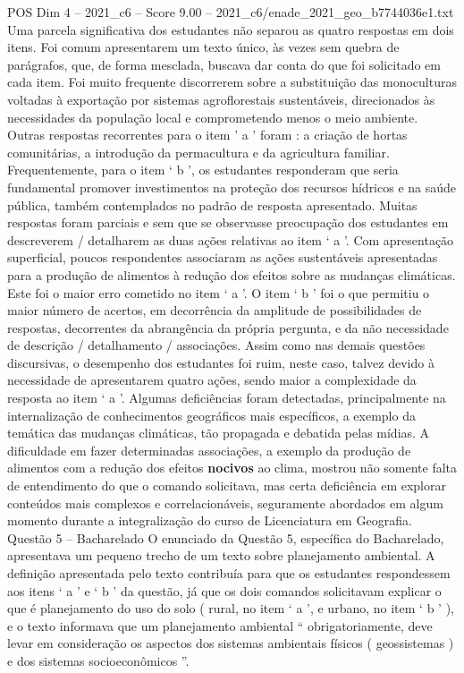 \begin{textsample}{POS Dim 4 – 2021\_c6 – Score 9.00 – 2021\_c6/enade\_2021\_geo\_b7744036e1.txt}
Uma parcela significativa dos estudantes não separou as quatro respostas em dois itens.
Foi comum apresentarem um texto único, às vezes sem quebra de parágrafos, que, de forma mesclada, buscava dar conta do que foi solicitado em cada item.
Foi muito frequente discorrerem sobre a substituição das monoculturas voltadas à exportação por sistemas agroflorestais sustentáveis, direcionados às necessidades da população local e comprometendo menos o meio ambiente.
Outras respostas recorrentes para o item ’ a ’ foram : a criação de hortas comunitárias, a introdução da permacultura e da agricultura familiar.
Frequentemente, para o item ‘ b ’, os estudantes responderam que seria fundamental promover investimentos na proteção dos recursos hídricos e na saúde pública, também contemplados no padrão de resposta apresentado.
Muitas respostas foram parciais e sem que se observasse preocupação dos estudantes em descreverem / detalharem as duas ações relativas ao item ‘ a ’.
Com apresentação superficial, poucos respondentes associaram as ações sustentáveis apresentadas para a produção de alimentos à redução dos efeitos sobre as mudanças climáticas.
Este foi o maior erro cometido no item ‘ a ’.
O item ‘ b ’ foi o que permitiu o maior número de acertos, em decorrência da amplitude de possibilidades de respostas, decorrentes da abrangência da própria pergunta, e da não necessidade de descrição / detalhamento / associações.
Assim como nas demais questões discursivas, o desempenho dos estudantes foi ruim, neste caso, talvez devido à necessidade de apresentarem quatro ações, sendo maior a complexidade da resposta ao item ‘ a ’.
Algumas deficiências foram detectadas, principalmente na internalização de conhecimentos geográficos mais específicos, a exemplo da temática das mudanças climáticas, tão propagada e debatida pelas mídias.
A dificuldade em fazer determinadas associações, a exemplo da produção de alimentos com a redução dos efeitos \textbf{nocivos} ao clima, mostrou não somente falta de entendimento do que o comando solicitava, mas certa deficiência em explorar conteúdos mais complexos e correlacionáveis, seguramente abordados em algum momento durante a integralização do curso de Licenciatura em Geografia.
Questão 5 – Bacharelado O enunciado da Questão 5, específica do Bacharelado, apresentava um pequeno trecho de um texto sobre planejamento ambiental.
A definição apresentada pelo texto contribuía para que os estudantes respondessem aos itens ‘ a ’ e ‘ b ’ da questão, já que os dois comandos solicitavam explicar o que é planejamento do uso do solo ( rural, no item ‘ a ’, e urbano, no item ‘ b ’ ), e o texto informava que um planejamento ambiental “ obrigatoriamente, deve levar em consideração os aspectos dos sistemas ambientais físicos ( geossistemas ) e dos sistemas socioeconômicos ”.

\end{textsample}

